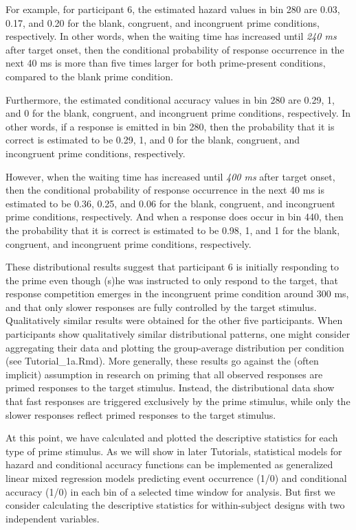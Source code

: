 \documentclass[
  man, donotrepeattitle,floatsintext]{apa6}
\begin{document}
For example, for participant 6, the estimated hazard values in bin 280 are 0.03, 0.17, and 0.20 for the blank, congruent, and incongruent prime conditions, respectively. In other words, when the waiting time has increased until \emph{240 ms} after target onset, then the conditional probability of response occurrence in the next 40 ms is more than five times larger for both prime-present conditions, compared to the blank prime condition.

Furthermore, the estimated conditional accuracy values in bin 280 are 0.29, 1, and 0 for the blank, congruent, and incongruent prime conditions, respectively. In other words, if a response is emitted in bin 280, then the probability that it is correct is estimated to be 0.29, 1, and 0 for the blank, congruent, and incongruent prime conditions, respectively.

However, when the waiting time has increased until \emph{400 ms} after target onset, then the conditional probability of response occurrence in the next 40 ms is estimated to be 0.36, 0.25, and 0.06 for the blank, congruent, and incongruent prime conditions, respectively. And when a response does occur in bin 440, then the probability that it is correct is estimated to be 0.98, 1, and 1 for the blank, congruent, and incongruent prime conditions, respectively.

These distributional results suggest that participant 6 is initially responding to the prime even though (s)he was instructed to only respond to the target, that response competition emerges in the incongruent prime condition around 300 ms, and that only slower responses are fully controlled by the target stimulus. Qualitatively similar results were obtained for the other five participants. When participants show qualitatively similar distributional patterns, one might consider aggregating their data and plotting the group-average distribution per condition (see Tutorial\_1a.Rmd). More generally, these results go against the (often implicit) assumption in research on priming that all observed responses are primed responses to the target stimulus. Instead, the distributional data show that fast responses are triggered exclusively by the prime stimulus, while only the slower responses reflect primed responses to the target stimulus.

At this point, we have calculated and plotted the descriptive statistics for each type of prime stimulus. As we will show in later Tutorials, statistical models for hazard and conditional accuracy functions can be implemented as generalized linear mixed regression models predicting event occurrence (1/0) and conditional accuracy (1/0) in each bin of a selected time window for analysis. But first we consider calculating the descriptive statistics for within-subject designs with two independent variables.
\end{document}
